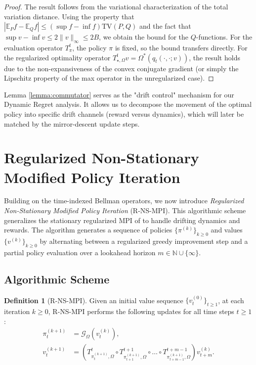 \documentclass{article}
\theoremstyle{plain}
\theoremstyle{definition}
\newtheorem{definition}[theorem]{Definition}
\theoremstyle{remark}
\newcommand{\1}{\mathbbm{1}}
\begin{document}
\begin{proof}
The result follows from the variational characterization of the total variation distance. Using the property that $|\mathbb{E}_P f - \mathbb{E}_Q f| \le (\sup f - \inf f) \mathrm{TV}(P, Q)$ and the fact that $\sup v - \inf v \le 2\|v\|_\infty \le 2B$, we obtain the bound for the $Q$-functions.
For the evaluation operator $T^t_\pi$, the policy $\pi$ is fixed, so the bound transfers directly. For the regularized optimality operator $T^t_{\star, \Omega}v = \Omega^*(q_t(\cdot, \cdot; v))$, the result holds due to the non-expansiveness of the convex conjugate gradient (or simply the Lipschitz property of the max operator in the unregularized case).
\end{proof}

Lemma \ref{lemma:commutator} serves as the "drift control" mechanism for our Dynamic Regret analysis. It allows us to decompose the movement of the optimal policy into specific drift channels (reward versus dynamics), which will later be matched by the mirror-descent update steps.

\section{Regularized Non-Stationary Modified Policy Iteration}
\label{sec:r_ns_mpi}

Building on the time-indexed Bellman operators, we now introduce \textit{Regularized Non-Stationary Modified Policy Iteration} (R-NS-MPI). This algorithmic scheme generalizes the stationary regularized MPI of \cite{geist2019theory} to handle drifting dynamics and rewards. The algorithm generates a sequence of policies $\{\pi^{(k)}\}_{k \ge 0}$ and values $\{v^{(k)}\}_{k \ge 0}$ by alternating between a regularized greedy improvement step and a partial policy evaluation over a lookahead horizon $m \in \mathbb{N} \cup \{\infty\}$.

\subsection{Algorithmic Scheme}

\begin{definition}[R-NS-MPI]
\label{def:r_ns_mpi}
Given an initial value sequence $\{v_t^{(0)}\}_{t \ge 1}$, at each iteration $k \ge 0$, R-NS-MPI performs the following updates for all time steps $t \ge 1$:
\begin{align}
    \pi_t^{(k+1)} &= \mathcal{G}_\Omega(v_t^{(k)}), \label{eq:greedy_step} \\
    v_t^{(k+1)} &= \left( T_{\pi_t^{(k+1)}, \Omega}^t \circ T_{\pi_{t+1}^{(k+1)}, \Omega}^{t+1} \circ \dots \circ T_{\pi_{t+m-1}^{(k+1)}, \Omega}^{t+m-1} \right) v_{t+m}^{(k)}. \label{eq:eval_step}
\end{align}
\end{definition}
\end{document}
